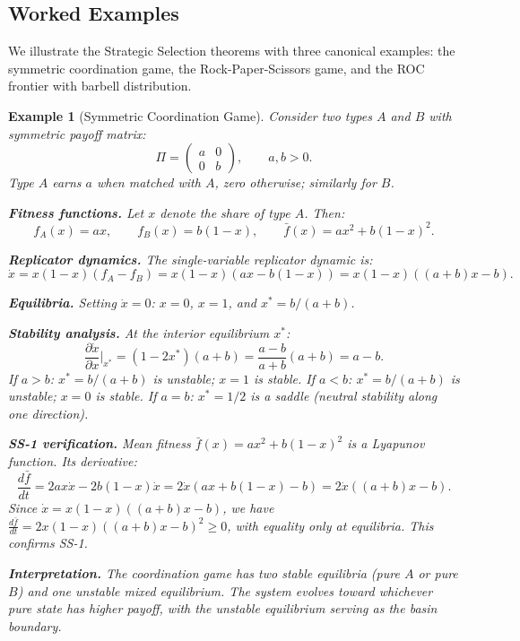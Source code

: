 \documentclass[12pt]{article}
\newtheorem{example}[theorem]{Example}
\begin{document}
\subsection{Worked Examples}

We illustrate the Strategic Selection theorems with three canonical examples: the symmetric coordination game, the Rock-Paper-Scissors game, and the ROC frontier with barbell distribution.

\begin{example}[Symmetric Coordination Game]
\label{ex:coordination}
Consider two types $A$ and $B$ with symmetric payoff matrix:
\[
\Pi = \begin{pmatrix} a & 0 \\ 0 & b \end{pmatrix}, \qquad a, b > 0.
\]
Type $A$ earns $a$ when matched with $A$, zero otherwise; similarly for $B$.

\textbf{Fitness functions.} Let $x$ denote the share of type $A$. Then:
\[
f_A(x) = ax, \qquad f_B(x) = b(1-x), \qquad \bar{f}(x) = ax^2 + b(1-x)^2.
\]

\textbf{Replicator dynamics.} The single-variable replicator dynamic is:
\[
\dot{x} = x(1-x)(f_A - f_B) = x(1-x)(ax - b(1-x)) = x(1-x)((a+b)x - b).
\]

\textbf{Equilibria.} Setting $\dot{x} = 0$: $x = 0$, $x = 1$, and $x^* = b/(a+b)$.

\textbf{Stability analysis.} At the interior equilibrium $x^*$:
\[
\frac{\partial \dot{x}}{\partial x}\bigg|_{x^*} = (1 - 2x^*)(a+b) = \frac{a-b}{a+b}(a+b) = a - b.
\]
If $a > b$: $x^* = b/(a+b)$ is unstable; $x = 1$ is stable.
If $a < b$: $x^* = b/(a+b)$ is unstable; $x = 0$ is stable.
If $a = b$: $x^* = 1/2$ is a saddle (neutral stability along one direction).

\textbf{SS-1 verification.} Mean fitness $\bar{f}(x) = ax^2 + b(1-x)^2$ is a Lyapunov function. Its derivative:
\[
\frac{d\bar{f}}{dt} = 2ax \dot{x} - 2b(1-x)\dot{x} = 2\dot{x}(ax + b(1-x) - b) = 2\dot{x}((a+b)x - b).
\]
Since $\dot{x} = x(1-x)((a+b)x - b)$, we have $\frac{d\bar{f}}{dt} = 2x(1-x)((a+b)x - b)^2 \geq 0$, with equality only at equilibria. This confirms SS-1.

\textbf{Interpretation.} The coordination game has two stable equilibria (pure $A$ or pure $B$) and one unstable mixed equilibrium. The system evolves toward whichever pure state has higher payoff, with the unstable equilibrium serving as the basin boundary.
\end{example}
\end{document}
